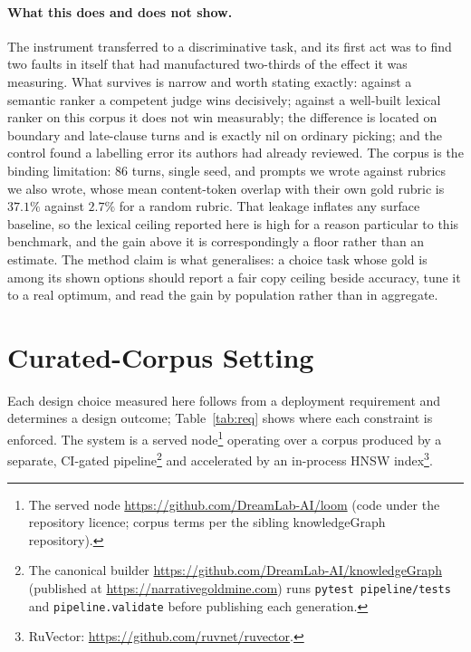 \documentclass[10pt,twocolumn]{article}
\begin{document}
\paragraph{What this does and does not show.} The instrument transferred to a discriminative task, and its first act was to find two faults in itself that had manufactured two-thirds of the effect it was measuring. What survives is narrow and worth stating exactly: against a semantic ranker a competent judge wins decisively; against a well-built lexical ranker on this corpus it does not win measurably; the difference is located on boundary and late-clause turns and is exactly nil on ordinary picking; and the control found a labelling error its authors had already reviewed. The corpus is the binding limitation: 86 turns, single seed, and prompts we wrote against rubrics we also wrote, whose mean content-token overlap with their own gold rubric is $37.1\%$ against $2.7\%$ for a random rubric. That leakage inflates any surface baseline, so the lexical ceiling reported here is high for a reason particular to this benchmark, and the gain above it is correspondingly a floor rather than an estimate. The method claim is what generalises: a choice task whose gold is among its shown options should report a fair copy ceiling beside accuracy, tune it to a real optimum, and read the gain by population rather than in aggregate.

\section{Curated-Corpus Setting}\label{sec:setting}
Each design choice measured here follows from a deployment requirement and determines a design outcome; Table~\ref{tab:req} shows where each constraint is enforced. The system is a served node\footnote{The served node \url{https://github.com/DreamLab-AI/loom} (code under the repository licence; corpus terms per the sibling knowledgeGraph repository).} operating over a corpus produced by a separate, CI-gated pipeline\footnote{The canonical builder \url{https://github.com/DreamLab-AI/knowledgeGraph} (published at \url{https://narrativegoldmine.com}) runs \texttt{pytest pipeline/tests} and \texttt{pipeline.validate} before publishing each generation.} and accelerated by an in-process HNSW index\footnote{RuVector: \url{https://github.com/ruvnet/ruvector}.}.
\end{document}
